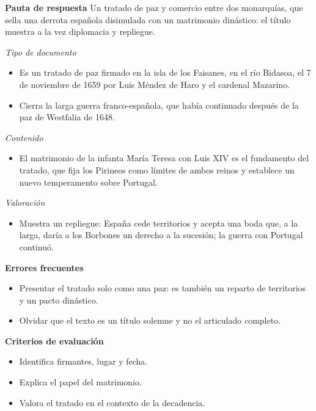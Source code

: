 \documentclass{book}
\begin{document}
\begin{tcolorbox}[title={Ejercicio resuelto}, studiumworked, breakable]
\noindent\textbf{Pauta de respuesta}
Un tratado de paz y comercio entre dos monarquías, que sella una derrota española disimulada con un matrimonio dinástico: el título muestra a la vez diplomacia y repliegue.


\noindent\textit{Tipo de documento}
\begin{itemize}
\item Es un tratado de paz firmado en la isla de los Faisanes, en el río Bidasoa, el 7 de noviembre de 1659 por Luis Méndez de Haro y el cardenal Mazarino.
\item Cierra la larga guerra franco-española, que había continuado después de la paz de Westfalia de 1648.
\end{itemize}

\noindent\textit{Contenido}
\begin{itemize}
\item El matrimonio de la infanta María Teresa con Luis XIV es el fundamento del tratado, que fija los Pirineos como límites de ambos reinos y establece un nuevo temperamento sobre Portugal.
\end{itemize}

\noindent\textit{Valoración}
\begin{itemize}
\item Muestra un repliegue: España cede territorios y acepta una boda que, a la larga, daría a los Borbones un derecho a la sucesión; la guerra con Portugal continuó.
\end{itemize}

\noindent\textbf{Errores frecuentes}
\begin{itemize}
\item Presentar el tratado solo como una paz: es también un reparto de territorios y un pacto dinástico.
\item Olvidar que el texto es un título solemne y no el articulado completo.
\end{itemize}

\noindent\textbf{Criterios de evaluación}
\begin{itemize}
\item Identifica firmantes, lugar y fecha.
\item Explica el papel del matrimonio.
\item Valora el tratado en el contexto de la decadencia.
\end{itemize}
\end{tcolorbox}
\end{document}
